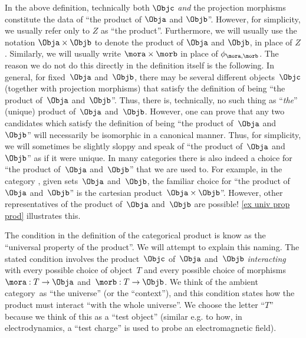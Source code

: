 \begin{remark}
    \label{prod unique up to iso}
    In the above definition, technically both $\Objc$ \emph{and} the projection morphisms constitute the data of ``the product of $\Obja$ and $\Objb$''. However, for simplicity, we usually refer only to $Z$ as ``the product''. Furthermore, we will usually use the notation $\Obja \times \Objb$ to denote the product of $\Obja$ and $\Objb$, in place of $Z$. Similarly, we will usually write $\mora \times \morb$ in place of $\phi_{\mora, \morb}$. The reason we do not do this directly in the definition itself is the following. In general, for fixed~$\Obja$ and~$\Objb$, there may be several different objects~$\Objc$ (together with projection morphisms) that satisfy the definition of being ``the product of~$\Obja$ and~$\Objb$''. Thus, there is, technically, no such thing as ``\emph{the}'' (unique) product of~$\Obja$ and~$\Objb$. However, one can prove that any two candidates which satisfy the definition of being ``the product of~$\Obja$ and~$\Objb$'' will necessarily be isomorphic in a canonical manner. Thus, for simplicity, we will sometimes be slightly sloppy and speak of ``the product of~$\Obja$ and~$\Objb$'' as if it were unique. In many categories there is also indeed a choice for ``the product of~$\Obja$ and~$\Objb$'' that we are used to. For example, in the category \Set, given sets~$\Obja$ and~$\Objb$, the familiar choice for ``the product of~$\Obja$ and~$\Objb$'' is the cartesian product~$\Obja \times \Objb$''. However, other representatives of the product of~$\Obja$ and~$\Objb$ are possible! \cref{ex univ prop prod} illustrates this.
\end{remark}

\begin{remark}
    The condition in the definition of the categorical product is know as the ``universal property of the product''. We will attempt to explain this naming. The stated condition involves the product~$\Objc$ of~$\Obja$ and~$\Objb$ \emph{interacting} with every possible choice of object~$T$ and every possible choice of morphisms~$\mora : T \to \Obja$ and~$\morb: T \to \Objb$. We think of the ambient category~\CatC as ``the universe'' (or the ``context''), and this condition states how the product must interact ``with the whole universe''.
    We choose the letter ``$T$'' because we think of this as a ``test object'' (similar e.g. to how, in electrodynamics, a ``test charge'' is used to probe an electromagnetic field).
\end{remark}


